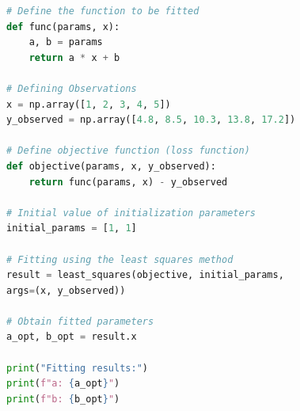 \documentclass[12pt]{article}  %
\begin{document}
\begin{ReportAiUse}{9}
\begin{lstlisting}[language=Python]
# Define the function to be fitted
def func(params, x):
    a, b = params
    return a * x + b

# Defining Observations
x = np.array([1, 2, 3, 4, 5])
y_observed = np.array([4.8, 8.5, 10.3, 13.8, 17.2])

# Define objective function (loss function)
def objective(params, x, y_observed):
    return func(params, x) - y_observed

# Initial value of initialization parameters
initial_params = [1, 1]

# Fitting using the least squares method
result = least_squares(objective, initial_params, 
args=(x, y_observed))

# Obtain fitted parameters
a_opt, b_opt = result.x

print("Fitting results:")
print(f"a: {a_opt}")
print(f"b: {b_opt}")
\end{lstlisting}


\end{ReportAiUse}
\end{document}
